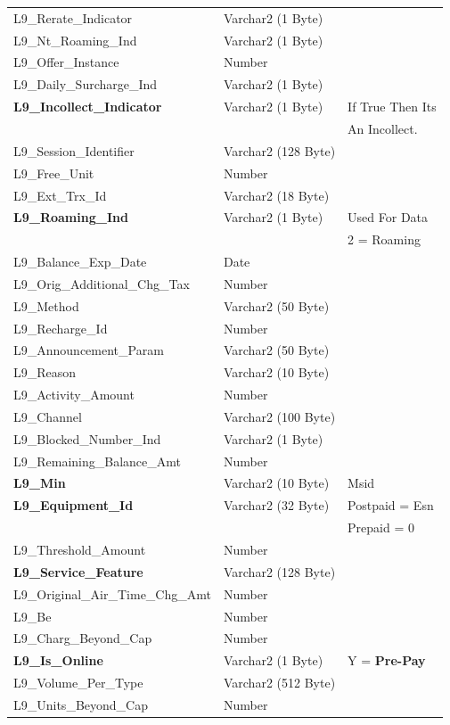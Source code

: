 \documentclass[12pt,twoside]{article}
\begin{document}
\begin{longtable}{l|l|l}
L9\_Rerate\_Indicator & Varchar2 (1 Byte) & \\
L9\_Nt\_Roaming\_Ind & Varchar2 (1 Byte) & \\
L9\_Offer\_Instance & Number & \\
L9\_Daily\_Surcharge\_Ind & Varchar2 (1 Byte) & \\
\textbf{L9\_Incollect\_Indicator} & Varchar2 (1 Byte) & If True Then Its\\
 &  & An Incollect.\\
L9\_Session\_Identifier & Varchar2 (128 Byte) & \\
L9\_Free\_Unit & Number & \\
L9\_Ext\_Trx\_Id & Varchar2 (18 Byte) & \\
\textbf{L9\_Roaming\_Ind} & Varchar2 (1 Byte) & Used For Data\\
 &  & 2 = Roaming\\
L9\_Balance\_Exp\_Date & Date & \\
L9\_Orig\_Additional\_Chg\_Tax & Number & \\
L9\_Method & Varchar2 (50 Byte) & \\
L9\_Recharge\_Id & Number & \\
L9\_Announcement\_Param & Varchar2 (50 Byte) & \\
L9\_Reason & Varchar2 (10 Byte) & \\
L9\_Activity\_Amount & Number & \\
L9\_Channel & Varchar2 (100 Byte) & \\
L9\_Blocked\_Number\_Ind & Varchar2 (1 Byte) & \\
L9\_Remaining\_Balance\_Amt & Number & \\
\textbf{L9\_Min} & Varchar2 (10 Byte) & Msid\\
\textbf{L9\_Equipment\_Id} & Varchar2 (32 Byte) & Postpaid = Esn\\
 &  & Prepaid = 0\\
L9\_Threshold\_Amount & Number & \\
\textbf{L9\_Service\_Feature} & Varchar2 (128 Byte) & \\
L9\_Original\_Air\_Time\_Chg\_Amt & Number & \\
L9\_Be & Number & \\
L9\_Charg\_Beyond\_Cap & Number & \\
\textbf{L9\_Is\_Online} & Varchar2 (1 Byte) & Y = \textbf{Pre-Pay}\\
L9\_Volume\_Per\_Type & Varchar2 (512 Byte) & \\
L9\_Units\_Beyond\_Cap & Number & \\

\end{longtable}
\end{document}

